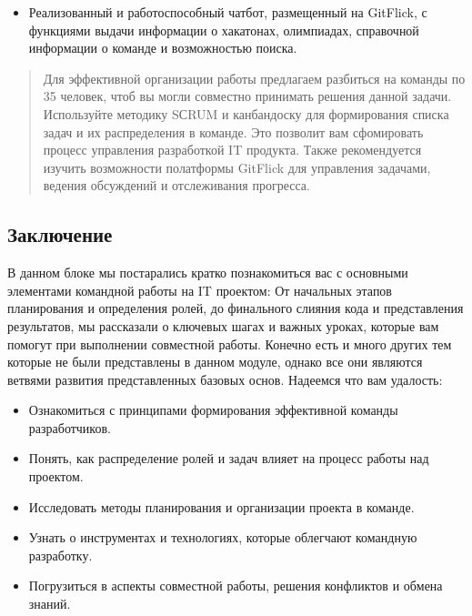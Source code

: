 \documentclass[letterpaper,10pt,russian]{sphinxmanual}
\begin{document}
\sphinxAtStartPar
{}
\begin{itemize}
\item {} 
\sphinxAtStartPar
Реализованный и работоспособный чат\sphinxhyphen{}бот, размещенный на GitFlick, с функциями выдачи информации о хакатонах, олимпиадах, справочной информации о команде и возможностью поиска.

\end{itemize}
\begin{quote}

\sphinxAtStartPar
{} Для эффективной организации работы предлагаем разбиться на команды по 3\sphinxhyphen{}5 человек, чтоб вы могли совместно принимать решения данной задачи. Используйте методику SСRUM и канбан\sphinxhyphen{}доску для формирования списка задач и их распределения в команде. Это позволит вам сфомировать процесс управления разработкой IT продукта. Также рекомендуется изучить возможности полатформы GitFlick для управления задачами, ведения обсуждений и отслеживания прогресса.
\end{quote}


\subsection{Заключение}
\label{\detokenize{educational_materials/team_work_on_a_gitflic/content:id2}}
\sphinxAtStartPar
В данном блоке мы постарались кратко познакомиться вас с основными элементами командной работы на IT проектом: От начальных этапов планирования и определения ролей, до финального слияния кода и представления результатов, мы рассказали о ключевых шагах и важных уроках, которые вам помогут при выполнении совместной работы. Конечно есть и много других тем которые не были представлены в данном модуле, однако все они являются ветвями развития представленных базовых основ. Надеемся что вам удалость:
\begin{itemize}
\item {} 
\sphinxAtStartPar
Ознакомиться с принципами формирования эффективной команды разработчиков.

\item {} 
\sphinxAtStartPar
Понять, как распределение ролей и задач влияет на процесс работы над проектом.

\item {} 
\sphinxAtStartPar
Исследовать методы планирования и организации проекта в команде.

\item {} 
\sphinxAtStartPar
Узнать о инструментах и технологиях, которые облегчают командную разработку.

\item {} 
\sphinxAtStartPar
Погрузиться в аспекты совместной работы, решения конфликтов и обмена знаний.

\end{itemize}
\end{document}
